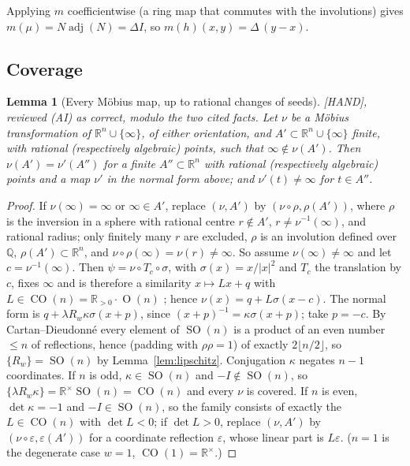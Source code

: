 \documentclass[11pt]{amsart}
\newcommand{\st}[1]{\textsf{[#1]}}
\newcommand{\Q}{\mathbb{Q}}
\newcommand{\R}{\mathbb{R}}
\DeclareMathOperator{\Ort}{O}
\DeclareMathOperator{\CO}{CO}
\DeclareMathOperator{\SO}{SO}
\DeclareMathOperator{\adj}{adj}
\theoremstyle{plain}
\newtheorem{lemma}[theorem]{Lemma}
\theoremstyle{definition}
\begin{document}
Applying $m$ coefficientwise (a ring map that commutes with the involutions) gives
$m(\mu)=N\adj(N)=\Delta I$, so $m(h)(x,y)=\Delta\,(y-x)$.

\subsection{Coverage}

\begin{lemma}[Every M\"obius map, up to rational changes of seeds]\label{lem:coverage}
\st{HAND}, reviewed (AI) as correct, modulo the two cited facts. Let $\nu$ be a M\"obius
transformation of $\R^n\cup\{\infty\}$, of either orientation, and $A'\subset\R^n\cup\{\infty\}$ finite,
with rational (respectively algebraic) points, such that $\infty\notin\nu(A')$. Then $\nu(A')=\nu'(A'')$
for a finite $A''\subset\R^n$ with rational (respectively algebraic) points and a map $\nu'$ in the
normal form above; and $\nu'(t)\neq\infty$ for $t\in A''$.
\end{lemma}

\begin{proof}
If $\nu(\infty)=\infty$ or $\infty\in A'$, replace $(\nu,A')$ by $(\nu\circ\rho,\rho(A'))$, where $\rho$
is the inversion in a sphere with rational centre $r\notin A'$, $r\ne\nu^{-1}(\infty)$, and rational
radius; only finitely many $r$ are excluded, $\rho$ is an involution defined over $\Q$, $\rho(A')\subset\R^n$,
and $\nu\circ\rho(\infty)=\nu(r)\ne\infty$. So assume $\nu(\infty)\neq\infty$ and let
$c=\nu^{-1}(\infty)$. Then $\psi=\nu\circ T_c\circ\sigma$, with $\sigma(x)=x/|x|^2$ and $T_c$ the
translation by $c$, fixes $\infty$ and is therefore a similarity $x\mapsto Lx+q$ with
$L\in\CO(n)=\R_{>0}\cdot\Ort(n)$ \cite[\S3.5]{Beardon}; hence $\nu(x)=q+L\sigma(x-c)$. The normal form
is $q+\lambda R_w\kappa\sigma(x+p)$, since $(x+p)^{-1}=\kappa\sigma(x+p)$; take $p=-c$. By
Cartan--Dieudonn\'e every element of $\SO(n)$ is a product of an even number $\le n$ of reflections,
hence (padding with $\rho\rho=1$) of exactly $2\lfloor n/2\rfloor$, so $\{R_w\}=\SO(n)$ by
Lemma~\ref{lem:lipschitz}. Conjugation $\kappa$ negates $n-1$ coordinates. If $n$ is odd,
$\kappa\in\SO(n)$ and $-I\notin\SO(n)$, so $\{\lambda R_w\kappa\}=\R^\times\SO(n)=\CO(n)$ and every
$\nu$ is covered. If $n$ is even, $\det\kappa=-1$ and $-I\in\SO(n)$, so the family consists of exactly the
$L\in\CO(n)$ with $\det L<0$; if $\det L>0$, replace $(\nu,A')$ by $(\nu\circ\varepsilon,\varepsilon(A'))$
for a coordinate reflection $\varepsilon$, whose linear part is $L\varepsilon$. ($n=1$ is the degenerate case $w=1$,
$\CO(1)=\R^\times$.)
\end{proof}
\end{document}
